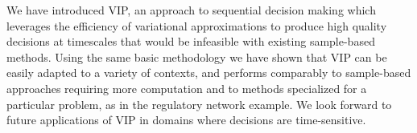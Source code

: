 We have introduced VIP, an approach to sequential decision making
which leverages the efficiency of variational approximations to
produce high quality decisions at timescales that would be infeasible
with existing sample-based methods.  Using the same basic methodology
we have shown that VIP can be easily adapted to a variety of contexts,
and performs comparably to sample-based approaches requiring more
computation and to methods specialized for a particular problem, as in
the regulatory network example.  We look forward to future
applications of VIP in domains where decisions are time-sensitive.



